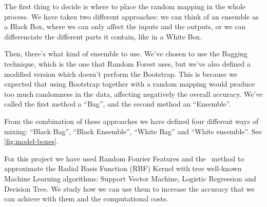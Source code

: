 \begin{pre-delivery}
  The first thing to decide is where to place the random mapping in the whole
  process. We have taken two different approaches: we can think of an
  ensemble as a Black Box, where we can only affect the inputs and the outputs,
  or we can differenciate the different parts it contain, like in a White Box.

  Then, there's what kind of ensemble to use. We've chosen to use the
  Bagging technique, which is the one that Random Forest uses, but we've
  also defined a modified version which doesn't perform the Bootstrap. This is
  because we expected that using Bootstrap together with a random mapping would
  produce too much randomness in the data, affecting negatively the
  overall accuracy. We've called the first method a ``Bag'', and the second
  method an ``Ensemble''.

  From the combination of these approaches we have defined four different
  ways of mixing: ``Black Bag'', ``Black Ensemble'', ``White Bag'' and
  ``White ensemble''. See \ref{fig:model-boxes}.

  For this project we have used Random Fourier Features and the \Nys\
  method to approximate the Radial Basis Function (RBF) Kernel with tree
  well-known Machine Learning algorithms: Support Vector Machine, Logistic
  Regression and Decision Tree. We study how we can use them to increase
  the accuracy that we can achieve with them and the computational costs.


\end{pre-delivery}
